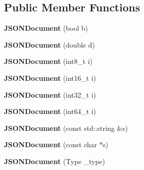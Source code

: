 \subsection*{Public Member Functions}
\begin{DoxyCompactItemize}
\item 
{\bfseries J\+S\+O\+N\+Document} (bool b)\hypertarget{classrocksdb_1_1JSONDocument_acb472e7939a3beac180ed7057f91ac4a}{}\label{classrocksdb_1_1JSONDocument_acb472e7939a3beac180ed7057f91ac4a}

\item 
{\bfseries J\+S\+O\+N\+Document} (double d)\hypertarget{classrocksdb_1_1JSONDocument_a34b25c53329b82f45eb32a675985b039}{}\label{classrocksdb_1_1JSONDocument_a34b25c53329b82f45eb32a675985b039}

\item 
{\bfseries J\+S\+O\+N\+Document} (int8\+\_\+t i)\hypertarget{classrocksdb_1_1JSONDocument_a5348870ce6c0f2e9f5c805c57016a131}{}\label{classrocksdb_1_1JSONDocument_a5348870ce6c0f2e9f5c805c57016a131}

\item 
{\bfseries J\+S\+O\+N\+Document} (int16\+\_\+t i)\hypertarget{classrocksdb_1_1JSONDocument_a992cb3d9c8e4489a471a28f394d54416}{}\label{classrocksdb_1_1JSONDocument_a992cb3d9c8e4489a471a28f394d54416}

\item 
{\bfseries J\+S\+O\+N\+Document} (int32\+\_\+t i)\hypertarget{classrocksdb_1_1JSONDocument_ab122a61ef505fd0b384cc61b0cd5cc8a}{}\label{classrocksdb_1_1JSONDocument_ab122a61ef505fd0b384cc61b0cd5cc8a}

\item 
{\bfseries J\+S\+O\+N\+Document} (int64\+\_\+t i)\hypertarget{classrocksdb_1_1JSONDocument_a31c519799de83d32cb013a0a21a02b04}{}\label{classrocksdb_1_1JSONDocument_a31c519799de83d32cb013a0a21a02b04}

\item 
{\bfseries J\+S\+O\+N\+Document} (const std\+::string \&s)\hypertarget{classrocksdb_1_1JSONDocument_aadc4879774f7156d40680750878ebead}{}\label{classrocksdb_1_1JSONDocument_aadc4879774f7156d40680750878ebead}

\item 
{\bfseries J\+S\+O\+N\+Document} (const char $\ast$s)\hypertarget{classrocksdb_1_1JSONDocument_a5b3dea6b5a1deabce9198213d4735dea}{}\label{classrocksdb_1_1JSONDocument_a5b3dea6b5a1deabce9198213d4735dea}

\item 
{\bfseries J\+S\+O\+N\+Document} (Type \+\_\+type)\hypertarget{classrocksdb_1_1JSONDocument_a7734a18e81252e0e197a4dbf7cdb75ec}{}\label{classrocksdb_1_1JSONDocument_a7734a18e81252e0e197a4dbf7cdb75ec}


\end{DoxyCompactItemize}
